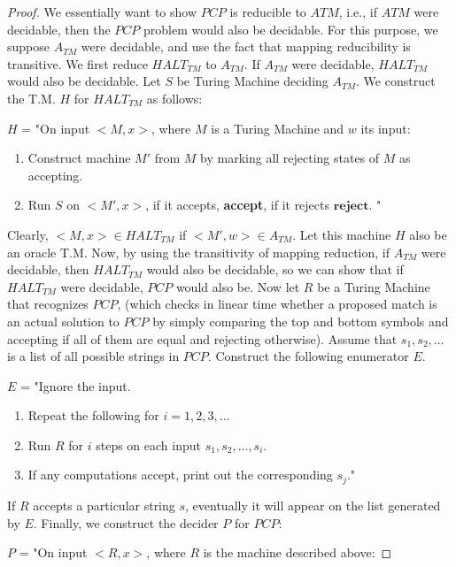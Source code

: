 \documentclass[12pt a]{article}
\theoremstyle{definition}
\theoremstyle{definition}
\theoremstyle{definition}
\begin{document}
{\begin{proof}
We essentially want to show $PCP$ is reducible to $ATM$, i.e., if $ATM$ were decidable, then the $PCP$ problem would also be decidable. For this purpose, we suppose $A_{TM}$ were decidable, and use the fact that mapping reducibility is transitive. We first reduce $HALT_{TM}$ to $A_{TM}$. If $A_{TM}$ were decidable, $HALT_{TM}$ would also be decidable. Let $S$ be Turing Machine deciding $A_{TM}$. We construct the T.M. $H$ for $HALT_{TM}$ as follows: 

$H$ = "On input $<M,x>$, where $M$ is a Turing Machine and $w$ its input:

\begin{enumerate}
	\item Construct machine $M'$ from $M$ by marking all rejecting states of $M$ as accepting. 
	\item Run $S$ on $<M',x>$, if it accepts, \textbf{accept}, if it rejects $\textbf{reject}$. "
\end{enumerate} 

Clearly, $<M,x> \in HALT_{TM}$ if $<M',w> \in A_{TM}$. Let this machine $H$ also be an oracle T.M. Now, by using the transitivity of mapping reduction, if $A_{TM}$ were decidable, then $HALT_{TM}$ would also be decidable, so we can show that if $HALT_{TM}$ were decidable, $PCP$ would also be. Now let $R$ be a Turing Machine that recognizes $PCP$, (which checks in linear time whether a proposed match is an actual solution to $PCP$ by simply comparing the top and bottom symbols and accepting if all of them are equal and rejecting otherwise). Assume that $s_{1},s_{2},\dots$ is a list of all possible strings in $PCP$. Construct the following enumerator $E$. 	

$E$ = "Ignore the input. 

\begin{enumerate}
	\item Repeat the following for $i=1,2,3,\dots$ 
	\item	Run $R$ for $i$ steps on each input $s_{1},s_{2},\dots, s_{i}$. 
	\item	If any computations accept, print out the corresponding $s_{j}$."
\end{enumerate}

If $R$ accepts a particular string $s$, eventually it will appear on the list generated by $E$. Finally, we construct the decider $P$ for $PCP$: 

$P$ = "On input $<R,x>$, where $R$ is the machine described above: 


\end{proof}}
\end{document}
